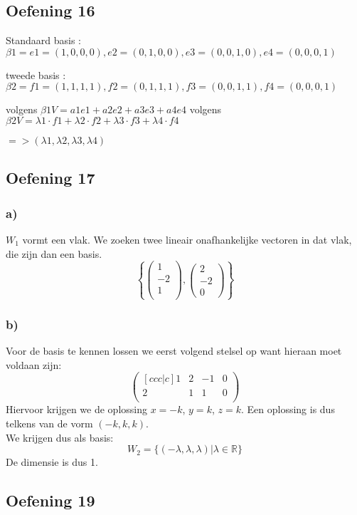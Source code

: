 \documentclass[lineaire_algebra_oplossingen.tex]{subfiles}
\begin{document}
\subsection{Oefening 16}

Standaard basis : $\beta1 = {e1 =(1,0,0,0), e2 =(0,1,0,0), e3 = (0,0,1,0), e4 = (0,0,0,1) }$

tweede basis : $\beta2 = {f1 = (1,1,1,1), f2 =(0,1,1,1), f3 = (0,0,1,1), f4= (0,0,0,1) }$

volgens $\beta1  V = a1e1 + a2e2 + a3e3 + a4e4$
volgens $\beta2 V = \lambda1 \cdot f1 + \lambda2 \cdot f2 + \lambda3 \cdot f3 + \lambda4 \cdot f4 $ 

$=> (\lambda1, \lambda2, \lambda3, \lambda4) $

\subsection{Oefening 17}
\subsubsection*{a)}
$W_1$ vormt een vlak. We zoeken twee lineair onafhankelijke vectoren in dat vlak, die zijn dan een basis.
\[
\left\lbrace
\begin{pmatrix}
1\\-2\\1\\
\end{pmatrix}
,
\begin{pmatrix}
2\\-2\\0
\end{pmatrix}
\right\rbrace
\]

\subsubsection*{b)}
Voor de basis te kennen lossen we eerst volgend stelsel op want hieraan moet voldaan zijn:
$$
\begin{pmatrix}[c c c | c]
1 & 2&-1&0\\
2&1&1&0\\
\end{pmatrix}
$$
Hiervoor krijgen we de oplossing $x=-k$, $y= k$, $z=k$. Een oplossing is dus telkens van de vorm $(-k,k,k)$.\\
We krijgen dus als basis:
$$W_2 = \{(-\lambda, \lambda, \lambda)|\lambda \in \mathbb{R}\}$$
De dimensie is dus 1.
\subsection{Oefening 19}
\end{document}
